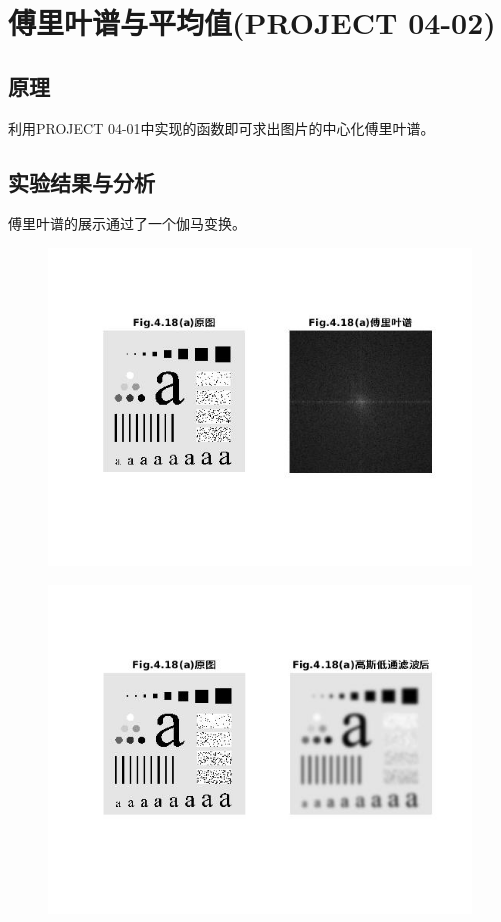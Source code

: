 \documentclass[logo,reportComp]{thesis}
\begin{document}
\section{傅里叶谱与平均值(PROJECT 04-02)}
\subsection{原理}
利用PROJECT 04-01中实现的函数即可求出图片的中心化傅里叶谱。

\subsection{实验结果与分析}
傅里叶谱的展示通过了一个伽马变换。
\begin{figure}[H]
\centering
\includegraphics[width=\linewidth]{fig/01.jpg}
\end{figure}
\begin{figure}[H]
\centering
\includegraphics[width=\linewidth]{fig/02.jpg}
\end{figure}
\end{document}
